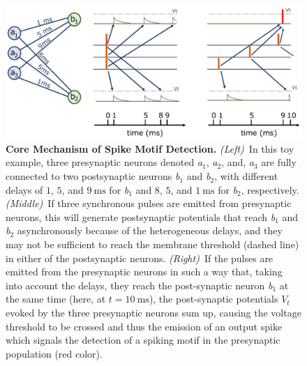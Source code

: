\documentclass[runningheads]{llncs}
\newcommand{\ms}{\si{\milli\second}}%
\begin{document}
%
\begin{figure}[t]
  \centering
  \includegraphics[width=0.95\linewidth]{figures/izhikevich.pdf}%
    \caption{\textbf{Core Mechanism of Spike Motif Detection.} \textit{(Left)}~In this toy example, three presynaptic neurons denoted \textit{a}$_1$, \textit{a}$_2$, and, \textit{a}$_3$ are fully connected to two postsynaptic neurons \textit{b}$_1$ and \textit{b}$_2$, with different delays of $1$, $5$, and $9~\ms$ for \textit{b}$_1$ and $8$, $5$, and $1~\ms$ for \textit{b}$_2$, respectively. \textit{(Middle)}~If three synchronous pulses are emitted from presynaptic neurons, this will generate postsynaptic potentials that reach \textit{b}$_1$ and \textit{b}$_2$ asynchronously because of the heterogeneous delays, and they may not be sufficient to reach the membrane threshold (dashed line) in either of the postsynaptic neurons. \textit{(Right)}~If the pulses are emitted from the presynaptic neurons in such a way that, taking into account the delays, they reach the post-synaptic neuron \textit{b}$_1$ at the same time (here, at $t=10~\ms$), the post-synaptic potentials $V_t$ evoked by the three presynaptic neurons sum up, causing the voltage threshold to be crossed and thus the emission of an output spike which signals the detection of a spiking motif in the presynaptic population (red color). %
     }
  \label{fig:izhikevich}
\end{figure}
\end{document}
